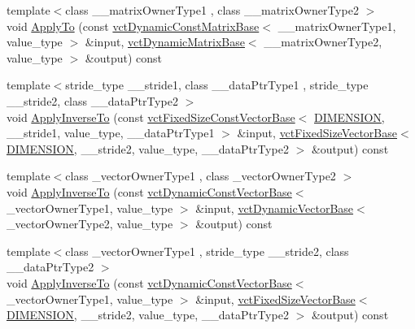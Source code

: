 \begin{DoxyCompactItemize}
{\footnotesize template$<$class \+\_\+\+\_\+matrix\+Owner\+Type1 , class \+\_\+\+\_\+matrix\+Owner\+Type2 $>$ }\\void \hyperlink{classvct_frame_base_a0505401809f053321347cd40d03a531c}{Apply\+To} (const \hyperlink{classvct_dynamic_const_matrix_base}{vct\+Dynamic\+Const\+Matrix\+Base}$<$ \+\_\+\+\_\+matrix\+Owner\+Type1, value\+\_\+type $>$ \&input, \hyperlink{classvct_dynamic_matrix_base}{vct\+Dynamic\+Matrix\+Base}$<$ \+\_\+\+\_\+matrix\+Owner\+Type2, value\+\_\+type $>$ \&output) const 
\item 
{\footnotesize template$<$stride\+\_\+type \+\_\+\+\_\+stride1, class \+\_\+\+\_\+data\+Ptr\+Type1 , stride\+\_\+type \+\_\+\+\_\+stride2, class \+\_\+\+\_\+data\+Ptr\+Type2 $>$ }\\void \hyperlink{classvct_frame_base_abbd4cea11e09dc6fa6a53e25abdcb35d}{Apply\+Inverse\+To} (const \hyperlink{classvct_fixed_size_const_vector_base}{vct\+Fixed\+Size\+Const\+Vector\+Base}$<$ \hyperlink{classvct_frame_base_a4284a4e875533c13df90a20c0233e043ad25b85efd5e4c2687ddf38ae18cd88f0}{D\+I\+M\+E\+N\+S\+I\+O\+N}, \+\_\+\+\_\+stride1, value\+\_\+type, \+\_\+\+\_\+data\+Ptr\+Type1 $>$ \&input, \hyperlink{classvct_fixed_size_vector_base}{vct\+Fixed\+Size\+Vector\+Base}$<$ \hyperlink{classvct_frame_base_a4284a4e875533c13df90a20c0233e043ad25b85efd5e4c2687ddf38ae18cd88f0}{D\+I\+M\+E\+N\+S\+I\+O\+N}, \+\_\+\+\_\+stride2, value\+\_\+type, \+\_\+\+\_\+data\+Ptr\+Type2 $>$ \&output) const 
\item 
{\footnotesize template$<$class \+\_\+vector\+Owner\+Type1 , class \+\_\+vector\+Owner\+Type2 $>$ }\\void \hyperlink{classvct_frame_base_aeef080a54a5ff97a0d923243de00a667}{Apply\+Inverse\+To} (const \hyperlink{classvct_dynamic_const_vector_base}{vct\+Dynamic\+Const\+Vector\+Base}$<$ \+\_\+vector\+Owner\+Type1, value\+\_\+type $>$ \&input, \hyperlink{classvct_dynamic_vector_base}{vct\+Dynamic\+Vector\+Base}$<$ \+\_\+vector\+Owner\+Type2, value\+\_\+type $>$ \&output) const 
\item 
{\footnotesize template$<$class \+\_\+vector\+Owner\+Type1 , stride\+\_\+type \+\_\+\+\_\+stride2, class \+\_\+\+\_\+data\+Ptr\+Type2 $>$ }\\void \hyperlink{classvct_frame_base_a1007112f94139cc870f4ccec636473c6}{Apply\+Inverse\+To} (const \hyperlink{classvct_dynamic_const_vector_base}{vct\+Dynamic\+Const\+Vector\+Base}$<$ \+\_\+vector\+Owner\+Type1, value\+\_\+type $>$ \&input, \hyperlink{classvct_fixed_size_vector_base}{vct\+Fixed\+Size\+Vector\+Base}$<$ \hyperlink{classvct_frame_base_a4284a4e875533c13df90a20c0233e043ad25b85efd5e4c2687ddf38ae18cd88f0}{D\+I\+M\+E\+N\+S\+I\+O\+N}, \+\_\+\+\_\+stride2, value\+\_\+type, \+\_\+\+\_\+data\+Ptr\+Type2 $>$ \&output) const 

\end{DoxyCompactItemize}
